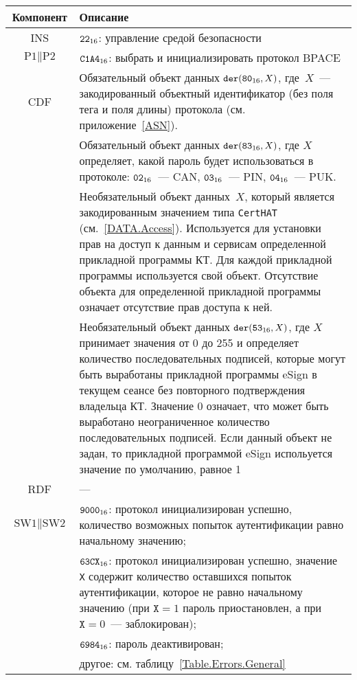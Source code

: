 \begin{table}[h]
\caption{}\label{Table.Oper.SetBPACECmd}
\begin{tabular}{|c|p{14cm}|}
\hline
Компонент & Описание \\
\hline
\hline
INS & $\texttt{22}_{16}$: управление средой безопасности\\ 
\hline
$\text{P1} \parallel\text{P2}$ & $\texttt{C1A4}_{16}$: выбрать и 
инициализировать протокол BPACE\\ 
\hline
CDF & Обязательный объект данных 
$\texttt{der}(\texttt{80}_{16}, X)$, где~$X$~--- 
закодированный объектный идентификатор (без поля тега и поля 
длины) протокола (см. приложение~\ref{ASN}).\\
& Обязательный объект данных $\texttt{der}(\texttt{83}_{16}, X)$, 
где $X$ определяет, какой пароль будет использоваться в протоколе: 
$\texttt{02}_{16}$~--- CAN,  $\texttt{03}_{16}$~--- PIN, 
$\texttt{04}_{16}$~--- PUK.\\
 & Необязательный объект данных~$X$, который является 
закодированным значением типа \verb|CertHAT| (см.~\ref{DATA.Access}). 
Используется для установки прав на доступ 
к данным и сервисам определенной прикладной программы КТ.
Для каждой прикладной программы используется свой объект.
Отсутствие объекта для определенной прикладной
программы означает отсутствие прав доступа к ней. \\
 & Необязательный объект данных $\texttt{der}(\texttt{53}_{16}, X)$, 
где $X$ принимает значения от 0 до 255 и 
определяет количество последовательных подписей, 
которые могут быть выработаны прикладной программы eSign
в текущем сеансе без повторного подтверждения владельца КТ.
Значение 0 означает, что может быть выработано 
неограниченное количество последовательных подписей. 
Если данный объект не задан, то прикладной программой eSign 
испольуется значение по умолчанию, равное 1 \\
\hline 
RDF &  --- \\
\hline
$\text{SW1} \parallel \text{SW2}$ & 
  $\texttt{9000}_{16}$: протокол инициализирован успешно,
количество возможных попыток аутентификации равно начальному значению; \\
 & $\texttt{63CX}_{16}$: протокол инициализирован успешно,
значение \texttt{X} содержит количество 
оставшихся попыток аутентификации, которое не равно начальному значению
(при $\texttt{X} = 1$ пароль приостановлен, а при $\texttt{X} = 0$~--- заблокирован);\\
& $\texttt{6984}_{16}$: пароль деактивирован; \\
 & другое: см. таблицу~\ref{Table.Errors.General} \\
\hline
\end{tabular}
\end{table}

